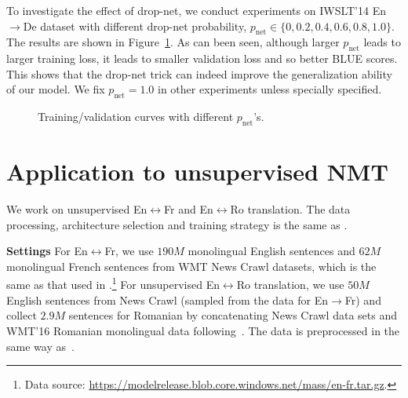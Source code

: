 \documentclass{article} \usepackage{iclr2020_conference,times}
\begin{document}
To investigate the effect of drop-net, we  conduct experiments on IWSLT'14 En$\to$De dataset with different drop-net probability, $p_{\text{net}}\in\{0,0.2,0.4,0.6,0.8,1.0\}$. The results are shown in Figure~\ref{fig:study_of_dropnet}. As can been seen, although larger $p_{\text{net}}$ leads to larger training loss, it leads to smaller validation loss and so better BLUE scores. This shows that the drop-net trick can indeed improve the generalization ability of our model. We fix $p_{\text{net}}=1.0$ in other experiments unless specially specified. 
\begin{figure}[!htpb]
\centering
\begin{minipage}{0.33\linewidth}
\end{minipage}\begin{minipage}{0.33\linewidth}
\end{minipage}\begin{minipage}{0.33\linewidth}
\end{minipage}
\caption{Training/validation curves with different $p_{\text{net}}$'s.}
\label{fig:study_of_dropnet}
\end{figure}



\section{Application to unsupervised NMT}\label{sec:unsupervised_nmt}
We work on unsupervised En$\leftrightarrow$Fr and En$\leftrightarrow$Ro translation. The data processing, architecture selection and training strategy is the same as \cite{lample2019cross}.

\noindent\textbf{Settings} For En$\leftrightarrow$Fr, we use $190M$ monolingual English sentences and $62M$ monolingual French sentences from WMT
News Crawl datasets, which is the same as that used in \citep{song2019mass}.\footnote{Data source: \url{https://modelrelease.blob.core.windows.net/mass/en-fr.tar.gz}.} For unsupervised En$\leftrightarrow$Ro translation, we use $50M$ English sentences from News Crawl (sampled from the data for En$\to$Fr) and collect $2.9M$ sentences for Romanian by concatenating News Crawl data sets and WMT'16 Romanian monolingual data following~\citet{lample2018phrase}. The data is preprocessed in the same way as~\citet{lample2019cross}. 
\end{document}
